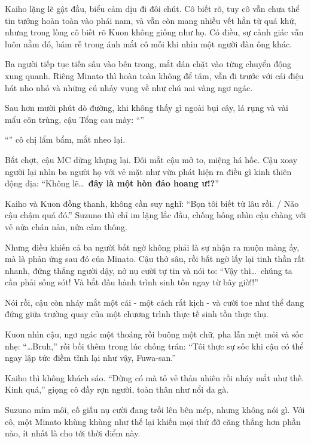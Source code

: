 \documentclass[../main.tex]{subfiles}
\begin{document}
Kaiho lặng lẽ gật đầu, biểu cảm dịu đi đôi chút. Cô biết rõ, tuy cô vẫn chưa thể tin tưởng hoàn toàn vào phái nam, và vẫn còn mang nhiều vết hằn từ quá khứ, nhưng trong lòng cô biết rõ Kuon không giống như họ. Có điều, sự cảnh giác vẫn luôn nằm đó, bám rễ trong ánh mắt cô mỗi khi nhìn một người đàn ông khác.

Ba người tiếp tục tiến sâu vào bên trong, mắt dán chặt vào từng chuyển động xung quanh. Riêng Minato thì hoàn toàn không để tâm, vẫn đi trước với cái điệu hát nho nhỏ và những cú nhảy vụng về như chú nai vàng ngơ ngác.

Sau hơn mười phút dò đường, khi không thấy gì ngoài bụi cây, lá rụng và vài mẩu côn trùng, cậu Tổng cau mày: ``''

``'' cô chị lẩm bẩm, mắt nheo lại.

Bất chợt, cậu MC dừng khựng lại. Đôi mắt cậu mở to, miệng há hốc. Cậu xoay người lại nhìn ba người họ với vẻ mặt như vừa phát hiện ra điều gì kinh thiên động địa: ``Không lẽ\dots\ \textbf{đây là một hòn đảo hoang ư!?}''

Kaiho và Kuon đồng thanh, không cần suy nghĩ: ``Bọn tôi biết từ lâu rồi. / Não cậu chậm quá đó.'' Suzuno thì chỉ im lặng lắc đầu, chống hông nhìn cậu chàng với vẻ nửa chán nản, nửa cảm thông.

Nhưng điều khiến cả ba người bất ngờ không phải là sự nhận ra muộn màng ấy, mà là phản ứng sau đó của Minato. Cậu thở sâu, rồi bất ngờ lấy lại tinh thần rất nhanh, đứng thẳng người dậy, nở nụ cười tự tin và nói to: ``Vậy thì\dots\ chúng ta cần phải sống sót! Và bắt đầu hành trình sinh tồn ngay từ bây giờ!!''

Nói rồi, cậu còn nháy mắt một cái - một cách rất kịch - và cười toe như thể đang đứng giữa trường quay của một chương trình thực tế sinh tồn thực thụ.

Kuon nhìn cậu, ngơ ngác một thoáng rồi buông một chữ, pha lẫn mệt mỏi và sốc nhẹ: ``\dots Bruh,'' rồi bồi thêm trong lúc chống trán: ``Tôi thực sự sốc khi cậu có thể ngay lập tức điềm tĩnh lại như vậy, Fuwa-san.''

Kaiho thì không khách sáo. ``Đừng có mà tỏ vẻ thản nhiên rồi nháy mắt như thế. Kinh quá,'' giọng cô đầy rợn người, toàn thân như nổi da gà.

Suzuno mím môi, cố giấu nụ cười đang trồi lên bên mép, nhưng không nói gì. Với cô, một Minato khùng khùng như thế lại khiến mọi thứ đỡ căng thẳng hơn phần nào, ít nhất là cho tới thời điểm này.
\end{document}
